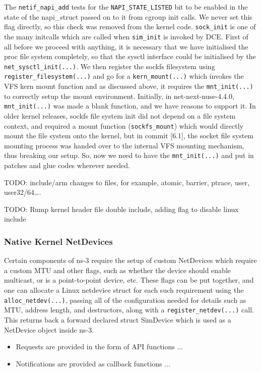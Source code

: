 \documentclass{sig-alternate}
\begin{document}
The \texttt{netif\_napi\_add} tests for the \texttt{NAPI\_STATE\_LISTED} bit to be enabled in the state of the napi\_struct passed on to it from cgroup init calls. 
We never set this flag directly, so this check was removed from the kernel code. \texttt{sock\_init} is one of the many initcalls which are called when 
\texttt{sim\_init} is invoked by DCE. First of all before we proceed with anything, it is necessary that we have initialised the proc file system completely,
so that the sysctl interface could be initialised by the \texttt{net\_sysctl\_init(...)}. We then register the sockfs filesystem using \texttt{register\_filesystem(...)} 
and go for a \texttt{kern\_mount(...)} which invokes the VFS kern mount function and as discussed above, it requires the \texttt{mnt\_init(...)} to correctly setup 
the mount environment. Initially, in net-next-nuse-4.4.0, \texttt{mnt\_init(...)}  was made a blank function, and we have reasons to support it. 
In older kernel releases, sockfs file system init did not depend on a file system context, and required a mount function (\texttt{sockfs\_mount}) which
would directly mount the file system onto the kernel, but in commit [6.1], the socket file system mounting process was handed over to the
internal VFS mounting mechanism, thus breaking our setup. So, now we need to have the \texttt{mnt\_init(...)} and put in patches and glue codes wherever
needed.

TODO: include/arm changes to files, for example, atomic, barrier, ptrace, user, user32/64….

TODO: Rump kernel header file double include, adding flag to disable linux include

\subsubsection{Native Kernel NetDevices}
Certain components of ns-3 require the setup of custom NetDevices which require a custom MTU and other flags, such as whether the device should enable multicast, or is a point-to-point device, etc. These flags can be put together, and one can allocate a Linux netdevice struct for each such requirement using
the \texttt{alloc\_netdev(...)}, passing all of the configuration needed for details such as MTU, address length, and destructors, along with a \texttt{register\_netdev(...)} call.
This returns back a forward declared struct SimDevice which is used as a NetDevice object inside ns-3.

\begin{itemize}
 \item Requests are provided in the form of API functions ...
 \item Notifications are provided as callback functions ...
\end{itemize}
\end{document}
